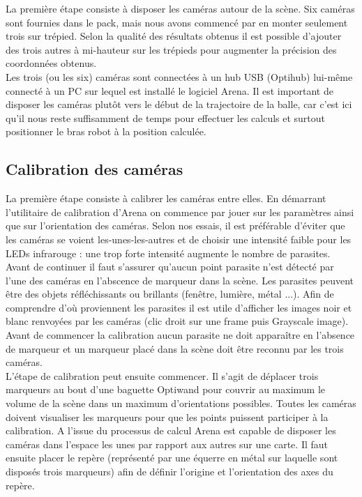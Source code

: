 \documentclass{article}[11pt]
\begin{document}
La première étape consiste à disposer les caméras autour de la scène. Six caméras sont fournies dans le pack, mais nous avons commencé par en monter seulement trois sur trépied. Selon la qualité des résultats obtenus il est possible d'ajouter des trois autres à mi-hauteur sur les trépieds pour augmenter la précision des coordonnées obtenus. \\

Les trois (ou les six) caméras sont connectées à un hub USB (Optihub) lui-même connecté à un PC sur lequel est installé le logiciel Arena. Il est important de disposer les caméras plutôt vers le début de la trajectoire de la balle, car c'est ici qu'il nous reste suffisamment de temps pour effectuer les calculs et surtout positionner le bras robot à la position calculée. \\

\subsection{Calibration des caméras}

La première étape consiste à calibrer les caméras entre elles. En démarrant l'utilitaire de calibration d'Arena on commence par jouer sur les paramètres ainsi que sur l'orientation des caméras. Selon nos essais, il est préférable d'éviter que les caméras se voient les-unes-les-autres et de choisir une intensité faible pour les LEDs infrarouge : une trop forte intensité augmente le nombre de parasites. Avant de continuer il faut s'assurer qu'aucun point parasite n'est détecté par l'une des caméras en l'abscence de marqueur dans la scène. Les parasites peuvent être des objets réfléchissants ou brillants (fenêtre, lumière, métal ...). Afin de comprendre d'où proviennent les parasites il est utile d'afficher les images noir et blanc renvoyées par les caméras (clic droit sur une frame puis Grayscale image). Avant de commencer la calibration aucun parasite ne doit apparaître en l'absence de marqueur et un marqueur placé dans la scène doit être reconnu par les trois caméras. \\

L'étape de calibration peut ensuite commencer. Il s'agit de déplacer trois marqueurs au bout d'une baguette Optiwand pour couvrir au maximum le volume de la scène dans un maximum d'orientations possibles. Toutes les caméras doivent visualiser les marqueurs pour que les points puissent participer à la calibration. A l'issue du processus de calcul Arena est capable de disposer les caméras dans l'espace les unes par rapport aux autres sur une carte. 
\newpage
Il faut ensuite placer le repère (représenté par une équerre en métal sur laquelle sont disposés trois marqueurs) afin de définir l'origine et l'orientation des axes du repère.\\
\end{document}
